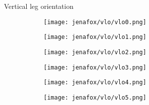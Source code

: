 \begin{frame}{Vertical leg orientation}%
    \begin{figure}[H]%
        \centering%
        \begin{subfigure}[t]{0.25\linewidth}%
            \centering%
            \texttt{[image: jenafox/vlo/vlo0.png]}
            \label{fig:jenafox-vlo0}%
        \end{subfigure}%
        \begin{subfigure}[t]{0.25\linewidth}%
            \centering%
            \texttt{[image: jenafox/vlo/vlo1.png]}
            \label{fig:jenafox-vlo1}%
            \vspace*{2mm}%
        \end{subfigure}%
        \begin{subfigure}[t]{0.25\linewidth}%
            \centering%
            \texttt{[image: jenafox/vlo/vlo2.png]}
            \label{fig:jenafox-vlo2}%
            \vspace*{2mm}%
        \end{subfigure}%
        \begin{subfigure}[t]{0.25\linewidth}%
            \centering%
            \texttt{[image: jenafox/vlo/vlo3.png]}
            \label{fig:jenafox-vlo3}%
            \vspace*{2mm}%
        \end{subfigure}%
        \vfil
        \begin{subfigure}[b]{0.25\linewidth}%
            \centering%
            \texttt{[image: jenafox/vlo/vlo4.png]}
            \label{fig:jenafox-vlo4}%
        \end{subfigure}%
        \begin{subfigure}[b]{0.25\linewidth}%
            \centering%
            \texttt{[image: jenafox/vlo/vlo5.png]}
            \label{fig:jenafox-vlo5}%

\end{subfigure}
\end{figure}
\end{frame}
